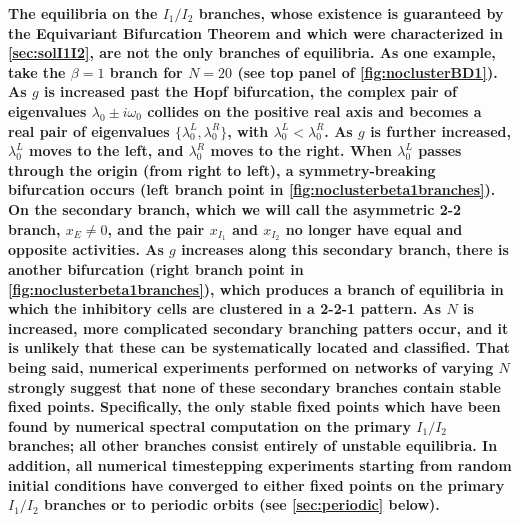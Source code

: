 \documentclass[reqno]{siamonline190516}
\newcommand{\revised}[1]{ \textbf{#1} }
\begin{document}
\revised{
The equilibria on the $I_1/I_2$ branches, whose existence is guaranteed by the Equivariant Bifurcation Theorem and which were characterized in \cref{sec:solI1I2}, are not the only branches of equilibria. As one example, take the $\beta=1$ branch for $N=20$ (see top panel of \cref{fig:noclusterBD1}). As $g$ is increased past the Hopf bifurcation, the complex pair of eigenvalues $\lambda_0 \pm i \omega_0$ collides on the positive real axis and becomes a real pair of eigenvalues $\{ \lambda_0^L, \lambda_0^R \}$, with $\lambda_0^L < \lambda_0^R$. As $g$ is further increased, $\lambda_0^L$ moves to the left, and $\lambda_0^R$ moves to the right. When $\lambda_0^L$ passes through the origin (from right to left), a symmetry-breaking bifurcation occurs (left branch point in \cref{fig:noclusterbeta1branches}). On the secondary branch, which we will call the asymmetric 2-2 branch, $x_E \neq 0$, and the pair $x_{I_1}$ and $x_{I_2}$ no longer have equal and opposite activities. As $g$ increases along this secondary branch, there is another bifurcation (right branch point in \cref{fig:noclusterbeta1branches}), which produces a branch of equilibria in which the inhibitory cells are clustered in a 2-2-1 pattern. As $N$ is increased, more complicated secondary branching patters occur, and it is unlikely that these can be systematically located and classified. That being said, numerical experiments performed on networks of varying $N$ strongly suggest that none of these secondary branches contain stable fixed points. Specifically, the only stable fixed points which have been found by numerical spectral computation on the primary $I_1/I_2$ branches; all other branches consist entirely of unstable equilibria. In addition, all numerical timestepping experiments starting from random initial conditions have converged to either fixed points on the primary $I_1/I_2$ branches or to periodic orbits (see \cref{sec:periodic} below).
}
\end{document}
